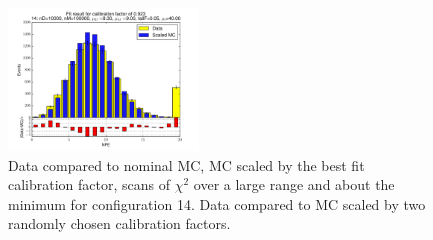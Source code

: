 \begin{figure}[htbp]
\begin{center}
\includegraphics[width=0.45\textwidth]{../FIGURES/14/FIG_Fit_result_for_calibration_factor_of_0_923.pdf} 
\caption{Data compared to nominal MC, MC scaled by the best fit calibration factor, scans of $\chi^2$ over a large range and about the minimum for configuration 14. Data compared to MC scaled by two randomly chosen calibration factors.} 
\label{tab:best_14} 
\end{center} \end{figure} 

